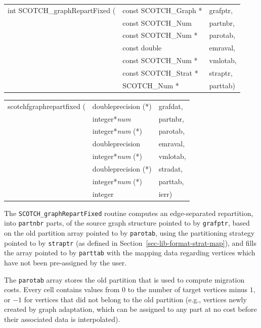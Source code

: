 \begin{itemize}
\progsyn

{\tt\begin{tabular}{l@{}ll}
int SCOTCH\_graphRepartFixed ( & const SCOTCH\_Graph * & grafptr, \\
                               & const SCOTCH\_Num     & partnbr, \\
                               & const SCOTCH\_Num *   & parotab, \\
                               & const double          & emraval, \\
                               & const SCOTCH\_Num *   & vmlotab, \\
                               & const SCOTCH\_Strat * & straptr, \\
                               & SCOTCH\_Num *         & parttab)
\end{tabular}}

{\tt\begin{tabular}{l@{}ll}
scotchfgraphrepartfixed ( & doubleprecision (*)   & grafdat, \\
                          & integer*{\it num}     & partnbr, \\
                          & integer*{\it num} (*) & parotab, \\
                          & doubleprecision       & emraval, \\
                          & integer*{\it num} (*) & vmlotab, \\
                          & doubleprecision (*)   & stradat, \\
                          & integer*{\it num} (*) & parttab, \\
                          & integer               & ierr)
\end{tabular}}

\progdes

The {\tt SCOTCH\_graphRepartFixed} routine computes an edge-separated
repartition, into {\tt partnbr} parts, of the source graph structure
pointed to by {\tt grafptr}, based on the old partition array pointed
to by {\tt parotab}, using the partitioning strategy pointed to by
{\tt straptr} (as defined in Section~\ref{sec-lib-format-strat-map}),
and fills the array pointed to by {\tt parttab} with the mapping data
regarding vertices which have not been pre-assigned by the user.

The {\tt parotab} array stores the old partition that is used to
compute migration costs. Every cell contains values from $0$ to the
number of target vertices minus $1$, or $-1$ for vertices that did not
belong to the old partition (e.g., vertices newly created by graph
adaptation, which can be assigned to any part at no cost before
their associated data is interpolated).


\end{itemize}
